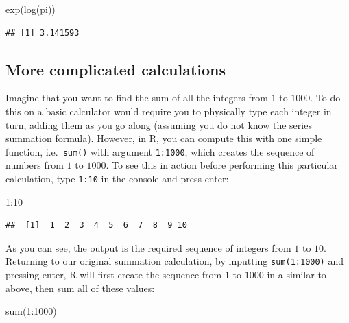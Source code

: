 \documentclass[
]{book}
\newenvironment{Shaded}{\begin{snugshade}}{\end{snugshade}}
\newcommand{\DecValTok}[1]{\textcolor[rgb]{0.00,0.00,0.81}{#1}}
\newcommand{\FunctionTok}[1]{\textcolor[rgb]{0.00,0.00,0.00}{#1}}
\newcommand{\NormalTok}[1]{#1}
\newcommand{\SpecialCharTok}[1]{\textcolor[rgb]{0.00,0.00,0.00}{#1}}
\theoremstyle{definition}
\theoremstyle{definition}
\theoremstyle{definition}
\theoremstyle{definition}
\theoremstyle{remark}
\begin{document}
\begin{Shaded}
\begin{Highlighting}[]
\FunctionTok{exp}\NormalTok{(}\FunctionTok{log}\NormalTok{(pi))}
\end{Highlighting}
\end{Shaded}

\begin{verbatim}
## [1] 3.141593
\end{verbatim}

\hypertarget{more-complicated-calculations}{%
\subsection{More complicated calculations}\label{more-complicated-calculations}}

Imagine that you want to find the sum of all the integers from \(1\) to \(1000\). To do this on a basic calculator would require you to physically type each integer in turn, adding them as you go along (assuming you do not know the series summation formula). However, in R, you can compute this with one simple function, i.e.~\texttt{sum()} with argument \texttt{1:1000}, which creates the sequence of numbers from \(1\) to \(1000\). To see this in action before performing this particular calculation, type \texttt{1:10} in the console and press enter:

\begin{Shaded}
\begin{Highlighting}[]
\DecValTok{1}\SpecialCharTok{:}\DecValTok{10}
\end{Highlighting}
\end{Shaded}

\begin{verbatim}
##  [1]  1  2  3  4  5  6  7  8  9 10
\end{verbatim}

As you can see, the output is the required sequence of integers from \(1\) to \(10\). Returning to our original summation calculation, by inputting \texttt{sum(1:1000)} and pressing enter, R will first create the sequence from \(1\) to \(1000\) in a similar to above, then sum all of these values:

\begin{Shaded}
\begin{Highlighting}[]
\FunctionTok{sum}\NormalTok{(}\DecValTok{1}\SpecialCharTok{:}\DecValTok{1000}\NormalTok{)}
\end{Highlighting}
\end{Shaded}
\end{document}
